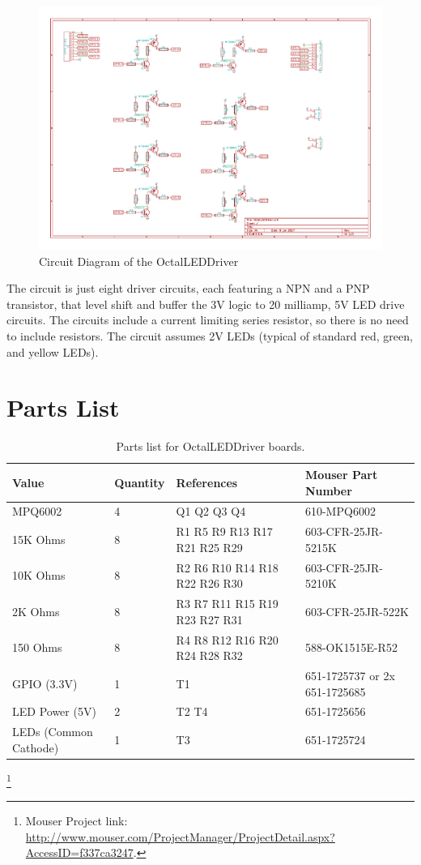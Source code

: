 \begin{figure}[hbpt]\begin{centering}%
\includegraphics[width=5in]{OctalLEDDriver.pdf}
\caption{Circuit Diagram of the OctalLEDDriver}
\end{centering}\end{figure}
The circuit is just eight driver circuits, each featuring a NPN and a PNP 
transistor, that level shift and buffer the 3V logic to 20 milliamp, 5V LED 
drive circuits.  The circuits include a current limiting series resistor, so 
there is no need to include resistors.  The circuit assumes 2V LEDs (typical 
of standard red, green, and yellow LEDs).

\section{Parts List}

\begin{table}[htdp]
\begin{centering}\begin{tabular}{|l|l|p{1in}|l|}
\hline
Value&Quantity&References&Mouser Part Number\\
\hline
MPQ6002&4&Q1 Q2 Q3 Q4&610-MPQ6002\\
\hline
15K Ohms&8&R1 R5 R9 R13 R17 R21 R25 R29&603-CFR-25JR-5215K\\
\hline
10K Ohms&8&R2 R6 R10 R14 R18 R22 R26 R30&603-CFR-25JR-5210K\\
\hline
2K Ohms&8&R3 R7 R11 R15 R19 R23 R27 R31&603-CFR-25JR-522K\\
\hline
150 Ohms&8&R4 R8 R12 R16 R20 R24 R28 R32&588-OK1515E-R52\\
\hline
GPIO (3.3V)&1&T1&651-1725737 or 2x 651-1725685 \\
\hline
LED Power (5V)&2&T2 T4&651-1725656\\
\hline
LEDs (Common Cathode)&1&T3&651-1725724\\
\hline
\end{tabular}
\caption{Parts list for OctalLEDDriver boards.}
\end{centering}\end{table}\footnote{Mouser Project link: 
\url{http://www.mouser.com/ProjectManager/ProjectDetail.aspx?AccessID=f337ca3247}.}

